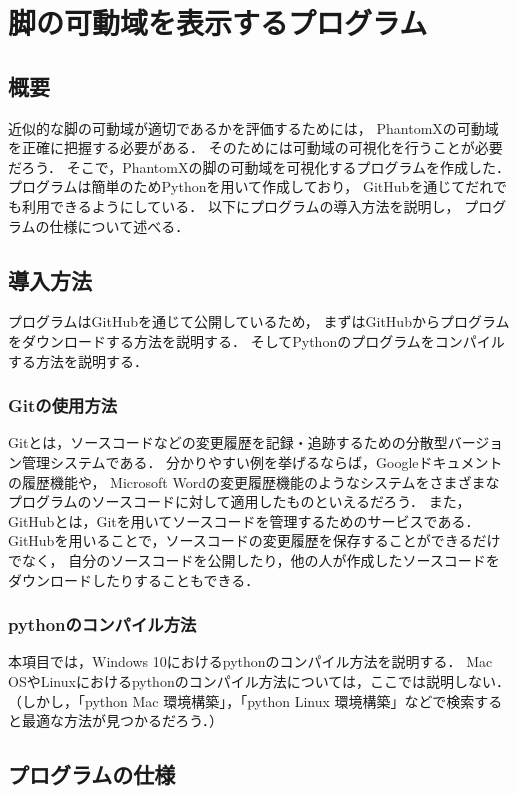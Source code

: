 ﻿

\chapter{脚の可動域を表示するプログラム}\label{chapter:leg_range_python}

\section{概要}
近似的な脚の可動域が適切であるかを評価するためには，
PhantomXの可動域を正確に把握する必要がある．
そのためには可動域の可視化を行うことが必要だろう．
そこで，PhantomXの脚の可動域を可視化するプログラムを作成した．
プログラムは簡単のためPythonを用いて作成しており，
GitHubを通じてだれでも利用できるようにしている．
以下にプログラムの導入方法を説明し，
プログラムの仕様について述べる．

\section{導入方法}
プログラムはGitHubを通じて公開しているため，
まずはGitHubからプログラムをダウンロードする方法を説明する．
そしてPythonのプログラムをコンパイルする方法を説明する．

\subsection{Gitの使用方法}
Gitとは，ソースコードなどの変更履歴を記録・追跡するための分散型バージョン管理システムである．
分かりやすい例を挙げるならば，Googleドキュメントの履歴機能や，
Microsoft Wordの変更履歴機能のようなシステムをさまざまなプログラムのソースコードに対して適用したものといえるだろう．
また，GitHubとは，Gitを用いてソースコードを管理するためのサービスである．
GitHubを用いることで，ソースコードの変更履歴を保存することができるだけでなく，
自分のソースコードを公開したり，他の人が作成したソースコードをダウンロードしたりすることもできる．

\subsection{pythonのコンパイル方法}
本項目では，Windows 10におけるpythonのコンパイル方法を説明する．
Mac OSやLinuxにおけるpythonのコンパイル方法については，ここでは説明しない．
（しかし，「python Mac 環境構築」，「python Linux 環境構築」などで検索すると最適な方法が見つかるだろう．）

\section{プログラムの仕様}

